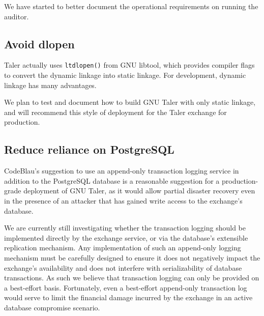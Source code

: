 \documentclass[11pt]{article}
\begin{document}
We have started to better document the operational requirements on running the
auditor.

\subsection{Avoid dlopen}

Taler actually uses {\tt ltdlopen()} from GNU libtool, which provides
compiler flags to convert the dynamic linkage into static linkage.  For
development, dynamic linkage has many advantages.

We plan to test and document how to build GNU Taler with only static
linkage, and will recommend this style of deployment for the Taler
exchange for production.

\subsection{Reduce reliance on PostgreSQL}

CodeBlau's suggestion to use an append-only transaction logging service in
addition to the PostgreSQL database is a reasonable suggestion for a
production-grade deployment of GNU Taler, as it would allow partial disaster
recovery even in the presence of an attacker that has gained write access to
the exchange's database.

We are currently still investigating whether the transaction logging should be
implemented directly by the exchange service, or via the database's extensible
replication mechanism.  Any implementation of such an append-only logging
mechanism must be carefully designed to ensure it does not negatively impact
the exchange's availability and does not interfere with serializability of
database transactions.  As such we believe that transaction logging can only be
provided on a best-effort basis.  Fortunately, even a best-effort append-only
transaction log would serve to limit the financial damage incurred by the
exchange in an active database compromise scenario.
\end{document}
